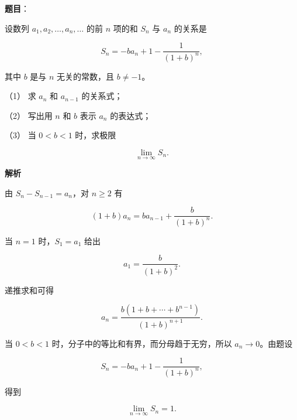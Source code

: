 \begin{answer}

\textbf{题目}：

设数列 $a_1,a_2,\ldots,a_n,\ldots$ 的前 $n$ 项的和 $S_n$ 与 $a_n$ 的关系是

\nopagebreak[4]
\[
S_n=-ba_n+1-\frac{1}{(1+b)^n},
\]

其中 $b$ 是与 $n$ 无关的常数，且 $b\ne-1$。

（1） 求 $a_n$ 和 $a_{n-1}$ 的关系式；

（2） 写出用 $n$ 和 $b$ 表示 $a_n$ 的表达式；

（3） 当 $0<b<1$ 时，求极限

\nopagebreak[4]
\[
\lim_{n\to\infty}S_n.
\]

\textbf{解析}


由 $S_n-S_{n-1}=a_n$，对 $n\ge2$ 有

\nopagebreak[4]
\[
(1+b)a_n=ba_{n-1}+\frac{b}{(1+b)^n}.
\]

当 $n=1$ 时，$S_1=a_1$ 给出

\nopagebreak[4]
\[
a_1=\frac{b}{(1+b)^2}.
\]


递推求和可得

\nopagebreak[4]
\[
a_n=\frac{b(1+b+\cdots+b^{n-1})}{(1+b)^{n+1}}.
\]


当 $0<b<1$ 时，分子中的等比和有界，而分母趋于无穷，所以 $a_n\to0$。由题设

\nopagebreak[4]
\[
S_n=-ba_n+1-\frac{1}{(1+b)^n},
\]

得到

\nopagebreak[4]
\[
\lim_{n\to\infty}S_n=1.
\]




\end{answer}
